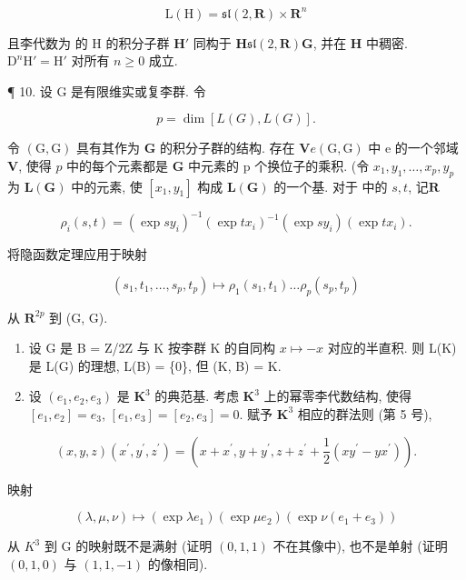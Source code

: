 \[
\mathrm{L} (\mathrm{H}) = \mathfrak {s l} (2, \mathbf {R}) \times \mathbf {R} ^ {n}
\]

且李代数为  的 H 的积分子群 \(\mathbf{H}'\) 同构于 \(\mathbf{H}\)\(\mathfrak{sl}(2,\mathbf{R})\)\(\mathbf{G}\), 并在 \(\mathbf{H}\) 中稠密. \(\mathrm{D}^n\mathrm{H}' = \mathrm{H}'\) 对所有 \(n\geqslant 0\) 成立.

¶ 10. 设 G 是有限维实或复李群. 令

\[
p = \dim [ L (G), L (G) ].
\]

令 \((\mathrm{G},\mathrm{G})\) 具有其作为 \(\mathbf{G}\) 的积分子群的结构. 存在 \(\mathbf{V}\)\(e\)\((\mathrm{G},\mathrm{G})\) 中 e 的一个邻域 \(\mathbf{V}\), 使得 \(p\) 中的每个元素都是 \(\mathbf{G}\) 中元素的 p 个换位子的乘积. (令 \(x_{1},y_{1},\ldots ,x_{p},y_{p}\) 为 \(\mathbf{L}(\mathbf{G})\) 中的元素, 使 \([x_1,y_1]\) 构成 \(\mathbf{L}(\mathbf{G})\) 的一个基. 对于  中的 \(s,t\), 记\(\mathbf{R}\)

\[
\rho_ {i} (s, t) = (\exp s y _ {i}) ^ {- 1} (\exp t x _ {i}) ^ {- 1} (\exp s y _ {i}) (\exp t x _ {i}).
\]

将隐函数定理应用于映射

\[
\left(s _ {1}, t _ {1}, \dots , s _ {p}, t _ {p}\right) \mapsto \rho_ {1} \left(s _ {1}, t _ {1}\right) \dots \rho_ {p} \left(s _ {p}, t _ {p}\right)
\]

从 \(\mathbf{R}^{2p}\) 到 (G, G).

\begin{enumerate}
\def\labelenumi{\arabic{enumi}.}
\setcounter{enumi}{10}
\item
  设 G 是 B = Z/2Z 与 K 按李群 K 的自同构 \(x \mapsto -x\) 对应的半直积. 则 L(K) 是 L(G) 的理想, L(B) = \{0\}, 但 (K, B) = K.
\item
  设 \((e_1, e_2, e_3)\) 是 \(\mathbf{K}^3\) 的典范基. 考虑 \(\mathbf{K}^3\) 上的幂零李代数结构, 使得 \([e_1, e_2] = e_3\), \([e_1, e_3] = [e_2, e_3] = 0\). 赋予 \(\mathbf{K}^3\) 相应的群法则 (第 5 号),
\end{enumerate}

\[
(x, y, z) (x ^ {\prime}, y ^ {\prime}, z ^ {\prime}) = (x + x ^ {\prime}, y + y ^ {\prime}, z + z ^ {\prime} + \frac {1}{2} (x y ^ {\prime} - y x ^ {\prime})).
\]

映射

\[
(\lambda , \mu , \nu) \mapsto (\exp \lambda e _ {1}) (\exp \mu e _ {2}) (\exp \nu (e _ {1} + e _ {3}))
\]

从 \(K^{3}\) 到 G 的映射既不是满射 (证明 \((0,1,1)\) 不在其像中), 也不是单射 (证明 \((0,1,0)\) 与 \((1,1,-1)\) 的像相同).

